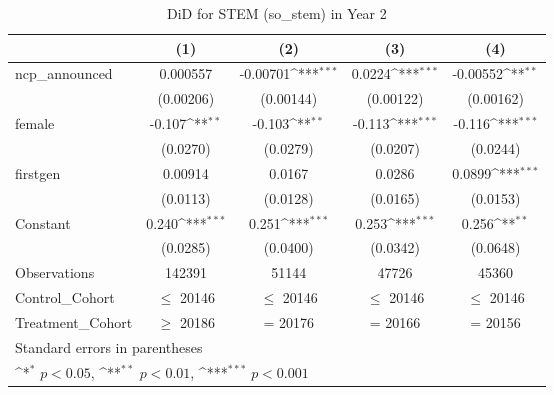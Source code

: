 \begin{table}[htbp]\centering
\def\sym#1{\ifmmode^{#1}\else\(^{#1}\)\fi}
\caption{DiD for STEM (so\_stem) in Year 2}
\begin{tabular}{l*{4}{c}}
\toprule
                &\multicolumn{1}{c}{(1)}         &\multicolumn{1}{c}{(2)}         &\multicolumn{1}{c}{(3)}         &\multicolumn{1}{c}{(4)}         \\
\midrule
ncp\_announced   & 0.000557         & -0.00701\sym{***}&   0.0224\sym{***}& -0.00552\sym{**} \\
                &(0.00206)         &(0.00144)         &(0.00122)         &(0.00162)         \\
\addlinespace
female          &   -0.107\sym{**} &   -0.103\sym{**} &   -0.113\sym{***}&   -0.116\sym{***}\\
                & (0.0270)         & (0.0279)         & (0.0207)         & (0.0244)         \\
\addlinespace
firstgen        &  0.00914         &   0.0167         &   0.0286         &   0.0899\sym{***}\\
                & (0.0113)         & (0.0128)         & (0.0165)         & (0.0153)         \\
\addlinespace
Constant        &    0.240\sym{***}&    0.251\sym{***}&    0.253\sym{***}&    0.256\sym{**} \\
                & (0.0285)         & (0.0400)         & (0.0342)         & (0.0648)         \\
\midrule
Observations    &   142391         &    51144         &    47726         &    45360         \\
Control\_Cohort  &$\le$ 20146         &$\le$ 20146         &$\le$ 20146         &$\le$ 20146         \\
Treatment\_Cohort&$\ge$ 20186         &  = 20176         &  = 20166         &  = 20156         \\
\bottomrule
\multicolumn{5}{l}{\footnotesize Standard errors in parentheses}\\
\multicolumn{5}{l}{\footnotesize \sym{*} \(p<0.05\), \sym{**} \(p<0.01\), \sym{***} \(p<0.001\)}\\
\end{tabular}
\end{table}
